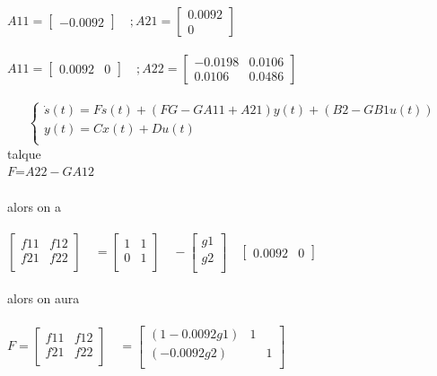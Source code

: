$A{11}=\begin{bmatrix}
-0.0092
\end{bmatrix}
\quad ;
A{21}=\begin{bmatrix}
0.0092\\
0
\end{bmatrix}$\\\\


$A{11}=\begin{bmatrix}
0.0092 & 0
\end{bmatrix}
\quad ;
A{22}=\begin{bmatrix}
-0.0198 & 0.0106 \\
0.0106 & 0.0486
\end{bmatrix}$\\\\
 


\begin{equation}
\left\{\begin{matrix}
\dot{s}(t)=Fs(t)+(FG-GA{11}+A{21})y(t)+(B2-GB{1}u(t))\\
 y(t)=Cx(t)+Du(t)\\
\end{matrix}\right.
\end{equation}   
talque\\ 
$F$=$A{22}-GA{12}$\\\\
alors on a \\\\
$\begin{bmatrix}
f11 & f12\\
f21 & f22\\
\end{bmatrix}
\quad=
\begin{bmatrix}
1 & 1\\
0 & 1\\
\end{bmatrix}
\quad-
\begin{bmatrix}
g1\\
g2\\
\end{bmatrix}
\quad
\begin{bmatrix}
0.0092 & 0
\end{bmatrix}$\\\\

alors on aura \\\\
$F=
\begin{bmatrix}
f11 & f12\\
f21 & f22\\
\end{bmatrix}
\quad=
\begin{bmatrix}
(1-0.0092g1) & 1\\
(-0.0092g2) && 1\\
\end{bmatrix}$\\\\

